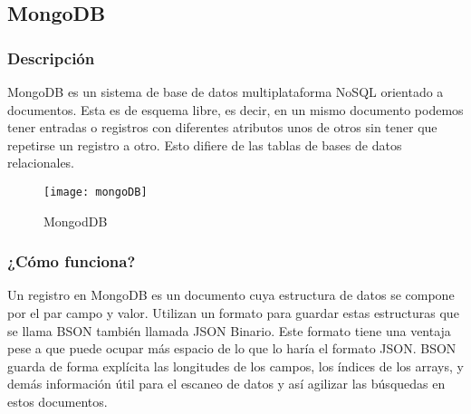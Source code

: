 

\subsection{MongoDB}

\subsubsection{ Descripción }

MongoDB  \cite{URL::MongoDB} es un sistema de base de datos multiplataforma NoSQL   \cite{URL::NoSQL} orientado a documentos. Esta es de esquema libre, es decir, en un mismo documento podemos tener entradas o registros con diferentes atributos unos de otros sin tener que repetirse un registro a otro. Esto difiere de las tablas de bases de datos relacionales.

    
\begin{figure}[h]
    \centering
    \texttt{[image: mongoDB]}
    \caption{ MongodDB }
    \label{fig:mongoDB}
\end{figure}

\subsubsection{ ¿Cómo funciona? }

Un registro en MongoDB es un documento cuya estructura de datos se compone por el par campo y valor. Utilizan un formato para guardar estas estructuras que se llama BSON  \cite{URL::BSON} también llamada JSON Binario. Este formato tiene una ventaja pese a que puede ocupar más espacio de lo que lo haría el formato JSON. BSON guarda de forma explícita las longitudes de los campos, los índices de los arrays, y demás información útil para el escaneo de datos y así agilizar las búsquedas en estos documentos.

